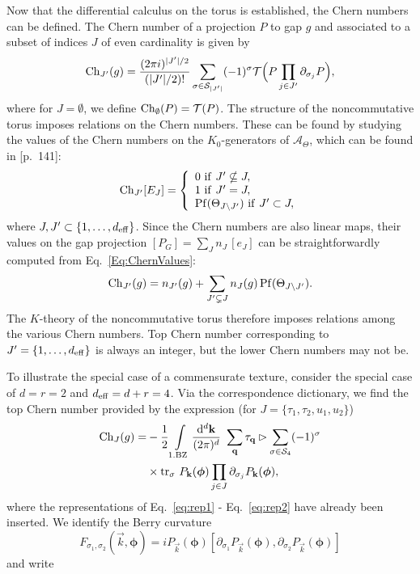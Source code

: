 \documentclass[
    10pt,
    aps,
    prb,
	longbibliography,
    twocolumn,
    floatfix,
    superscriptaddress,
]{revtex4-2}
\begin{document}
Now that the differential calculus on the torus is established, the Chern numbers can be defined.
The Chern number of a projection $P$ to gap $g$ and associated to a subset of indices $J$ of even cardinality is given by
\begin{equation}
	    {\rm Ch}_{J'}(g) = \frac{(2\pi i)^{|J'|/2}}{( |J'|/2 )!} \sum_{\sigma \in {\mathcal S}_{|J'|}} (-1)^\sigma {\mathcal T}\Big ( P \prod_{j \in J'} \partial_{\sigma_j}P \Big ) ,
\end{equation}
where for $J = \emptyset$, we define ${\rm Ch}_\emptyset(P) = {\mathcal T}(P)$.
The structure of the noncommutative torus imposes relations on the Chern numbers.
These can be found by studying the values of the Chern numbers on the $K_0$-generators of $\mathcal{A}_\Theta$, which can be found in \cite{Prodan2016}[p.~141]:
\begin{equation}\label{Eq:ChernValues}
{\rm Ch}_{J'} [E_J] = \left \{ 
\begin{array}{l}
0 \ {\rm if} \ J'\nsubseteq J  , \\
1 \ {\rm if} \ J' = J , \\
{\rm Pf}(\Theta_{J\setminus J'}) \ {\rm if} \ J' \subset J,
\end{array}
\right .  
\end{equation}
where $ J, J' \subset \{1,\ldots,{d_\mathrm{eff}}\}$.
Since the Chern numbers are also linear maps, their values on the gap projection $[P_G] = \sum_{J} n_J \, [e_J]$ can be straightforwardly computed from Eq.~\eqref{Eq:ChernValues}:
\begin{equation}\label{Eq:ChernVal}
{\rm Ch}_{J'}(g) = n_{J'}(g) + \sum_{J' \subsetneq J} n_J(g) \, {\rm Pf}(\Theta_{J\setminus J'}).
\end{equation} 
The $K$-theory of the noncommutative torus therefore imposes relations among the various Chern numbers. 
Top Chern number corresponding to $J'=\{1,\ldots,{d_\mathrm{eff}}\}$ is always an integer, but the lower Chern numbers may not be.

To illustrate the special case of a commensurate texture, consider the special case of $d=r=2$ and ${d_\mathrm{eff}} =d+r=4$.
Via the correspondence dictionary, we find the top Chern number provided by the expression (for $J=\lbrace \tau_1, \tau_2, u_1, u_2 \rbrace $)
\begin{align}
{\rm Ch}_{J}(g)
= & -\frac{1}{2}
\int\limits_{\mathrm{1.BZ}} \frac{\mathrm{d}^d \mathbf{k}}{(2\pi)^d}~\sum_{\mathbf{q}}\tau_{\mathbf{q}} \rhd\sum_{\sigma \in {\mathcal S}_{4}} (-1)^\sigma 
\notag \\ & 
\times \mathrm{tr}_\sigma ~ 
P_{\mathbf{k}}(\boldsymbol{\phi}) \prod_{j \in J} \partial_{\sigma_j}P_{\mathbf{k}}(\boldsymbol{\phi}),
\end{align}
where the representations of Eq.~\ref{eq:rep1} - Eq.~\ref{eq:rep2} have already been inserted.
We identify the Berry curvature 
\begin{equation}
	F_{\sigma_1, \sigma_2}(\vec{k}, \boldsymbol{\phi})
	= i P_{\vec{k}}(\boldsymbol{\phi}) [
	\partial_{\sigma_1} P_{\vec{k}}(\boldsymbol{\phi}), \partial_{\sigma_2} 
	P_{\vec{k}}(\boldsymbol{\phi}) ]
\end{equation}
and write
\end{document}
